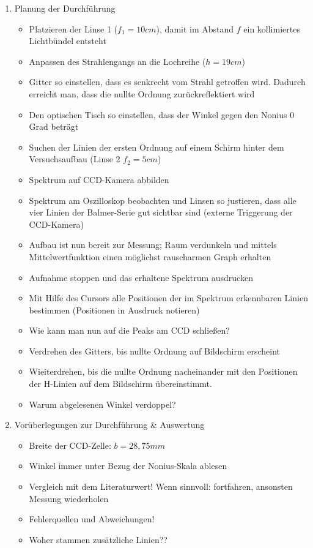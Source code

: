 \documentclass{article}
\begin{document}
\begin{enumerate}[label = (\Roman*)]
    \item Planung der Durchführung
        \begin{itemize}
            \item Platzieren der Linse 1 ($f_1=10cm$), damit im Abstand $f$ ein kollimiertes Lichtbündel entsteht
            \item Anpassen des Strahlengangs an die Lochreihe ($h=19cm$)
            \item Gitter so einstellen, dass es senkrecht vom Strahl getroffen wird. Dadurch erreicht man, dass die nullte Ordnung zurückreflektiert wird
            \item Den optischen Tisch so einstellen, dass der Winkel gegen den Nonius 0 Grad beträgt
            \item Suchen der Linien der ersten Ordnung auf einem Schirm hinter dem Versuchsaufbau (Linse 2 $f_2=5cm$)
            \item Spektrum auf CCD-Kamera abbilden
            \item Spektrum am Oszilloskop beobachten und Linsen so justieren, dass alle vier Linien der Balmer-Serie gut sichtbar sind (externe Triggerung der CCD-Kamera)
            \item Aufbau ist nun bereit zur Messung; Raum verdunkeln und mittels Mittelwertfunktion einen möglichst rauscharmen Graph erhalten
            \item Aufnahme stoppen und das erhaltene Spektrum ausdrucken
            \item Mit Hilfe des Cursors alle Positionen der im Spektrum erkennbaren Linien bestimmen (Positionen in Ausdruck notieren)
            \item Wie kann man nun auf die Peaks am CCD schließen?
            \item Verdrehen des Gitters, bis nullte Ordnung auf Bildschirm erscheint
            \item Wieiterdrehen, bis die nullte Ordnung nacheinander mit den Positionen der H-Linien auf dem Bildschirm übereinstimmt. 
            \item Warum abgelesenen Winkel verdoppel?
            \end{itemize}

    \item Vorüberlegungen zur Durchführung \& Auswertung
        \begin{itemize}
            \item Breite der CCD-Zelle: $b=28,75mm$
            \item Winkel immer unter Bezug der Nonius-Skala ablesen
            \item Vergleich mit dem Literaturwert! Wenn sinnvoll: fortfahren, ansonsten Messung wiederholen
            \item Fehlerquellen und Abweichungen!
            \item Woher stammen zusätzliche Linien??
        \end{itemize}
    
\end{enumerate}
\end{document}
